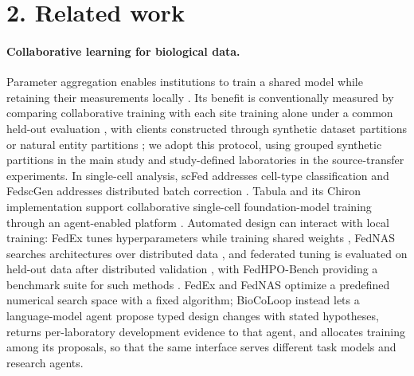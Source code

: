 \section*{2. Related work}
\paragraph{Collaborative learning for biological data.}
Parameter aggregation enables institutions to train a shared model while retaining their measurements locally \citep{McMahan2017,Sheller2020}. Its benefit is conventionally measured by comparing collaborative training with each site training alone under a common held-out evaluation \citep{Sheller2020,Chang2018Distributed,Dayan2021FederatedCOVID,Terrail2022FLamby,WarnatHerresthal2021Swarm,Saldanha2022Swarm}, with clients constructed through synthetic dataset partitions \citep{McMahan2017,He2020FedML} or natural entity partitions \citep{Caldas2018LEAF}; we adopt this protocol, using grouped synthetic partitions in the main study and study-defined laboratories in the source-transfer experiments. In single-cell analysis, scFed addresses cell-type classification and FedscGen addresses distributed batch correction \citep{Wang2024scFed,Bakhtiari2025FedscGen}. Tabula and its Chiron implementation support collaborative single-cell foundation-model training through an agent-enabled platform \citep{Ding2026Tabula,ChironCode}. Automated design can interact with local training: FedEx tunes hyperparameters while training shared weights \citep{Khodak2021FedEx}, FedNAS searches architectures over distributed data \citep{He2020FedNAS}, and federated tuning is evaluated on held-out data after distributed validation \citep{Holly2022FederatedHPO}, with FedHPO-Bench providing a benchmark suite for such methods \citep{Wang2023FedHPOBench}. FedEx and FedNAS optimize a predefined numerical search space with a fixed algorithm; BioCoLoop instead lets a language-model agent propose typed design changes with stated hypotheses, returns per-laboratory development evidence to that agent, and allocates training among its proposals, so that the same interface serves different task models and research agents.


